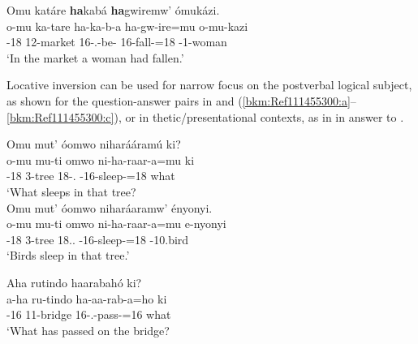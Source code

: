\documentclass[output=paper]{langscibook}
\begin{document}
\z

\ea
\label{bkm:Ref117063055}
Omu katáre \textbf{ha}kabá \textbf{ha}gwiremw’ ómukázi.\\
\gll
o-mu  ka-tare  ha-ka-b-a  ha-gw-ire=mu  o-mu-kazi\\
\AUG{}-18  12-market  16\SM{}-\F{}.\PST{}-be-\FV{}  16\SM{}-fall-\PFV{}=18  \AUG{}-1-woman\\
\glt
‘In the market a woman had fallen.’\\


\z

Locative inversion can be used for narrow focus on the postverbal logical subject, as shown for the question-answer pairs in  and (\ref{bkm:Ref111455300:a}--\ref{bkm:Ref111455300:c}), or in thetic\slash presentational contexts, as in  in answer to .

\ea
\label{bkm:Ref111455291}
\ea
Omu mut’ óomwo niharááramú ki?\\
\gll
o-mu  mu-ti  omwo  ni-ha-raar-a=mu  ki\\
\AUG{}-18  3-tree  18-\DEM{}.\MED{}  \IPFV{}-16\SM{}-sleep-\FV{}=18  what\\
\glt
‘What sleeps in that tree?\\


\ex
Omu mut’ óomwo niharáaramw’ ényonyi.\\
\gll
o-mu  mu-ti  omwo  ni-ha-raar-a=mu  e-nyonyi\\
\AUG{}-18  3-tree  18.\DEM{}.\MED{}  \IPFV{}-16\SM{}-sleep-\FV{}=18  \AUG{}-10.bird\\
\glt
‘Birds sleep in that tree.’\\


\z
\z

\ea
\label{bkm:Ref111455300}

\ea
\label{bkm:Ref111455300:a}
Aha rutindo haarabahó ki?\\
\gll
a-ha  ru-tindo  ha-aa-rab-a=ho  ki\\
\AUG{}-16  11-bridge  16\SM{}-\N{}.\PST{}-pass-\FV{}=16  what\\
\glt
‘What has passed on the bridge?\\
\end{document}
